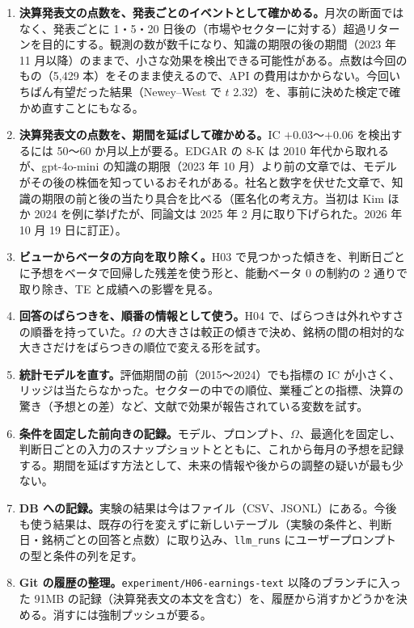 \documentclass[xelatex,ja=standard,jafont=haranoaji,a4paper,10pt,openany]{bxjsreport}
\newcommand{\code}[1]{\texttt{#1}}
\begin{document}
\begin{enumerate}
\item \textbf{決算発表文の点数を、発表ごとのイベントとして確かめる。}月次の断面ではなく、発表ごとに 1・5・20 日後の（市場やセクターに対する）超過リターンを目的にする。観測の数が数千になり、知識の期限の後の期間（2023 年 11 月以降）のままで、小さな効果を検出できる可能性がある。点数は今回のもの（5,429 本）をそのまま使えるので、API の費用はかからない。今回いちばん有望だった結果（Newey--West で $t$ 2.32）を、事前に決めた検定で確かめ直すことにもなる。
\item \textbf{決算発表文の点数を、期間を延ばして確かめる。}IC $+0.03$〜$+0.06$ を検出するには 50〜60 か月以上が要る。EDGAR の 8-K は 2010 年代から取れるが、gpt-4o-mini の知識の期限（2023 年 10 月）より前の文章では、モデルがその後の株価を知っているおそれがある。社名と数字を伏せた文章で、知識の期限の前と後の当たり具合を比べる（匿名化の考え方。当初は Kim ほか 2024 を例に挙げたが、同論文は 2025 年 2 月に取り下げられた。2026 年 10 月 19 日に訂正）。
\item \textbf{ビューからベータの方向を取り除く。}H03 で見つかった傾きを、判断日ごとに予想をベータで回帰した残差を使う形と、能動ベータ 0 の制約の 2 通りで取り除き、TE と成績への影響を見る。
\item \textbf{回答のばらつきを、順番の情報として使う。}H04 で、ばらつきは外れやすさの順番を持っていた。$\Omega$ の大きさは較正の傾きで決め、銘柄の間の相対的な大きさだけをばらつきの順位で変える形を試す。
\item \textbf{統計モデルを直す。}評価期間の前（2015〜2024）でも指標の IC が小さく、リッジは当たらなかった。セクターの中での順位、業種ごとの指標、決算の驚き（予想との差）など、文献で効果が報告されている変数を試す。
\item \textbf{条件を固定した前向きの記録。}モデル、プロンプト、$\Omega$、最適化を固定し、判断日ごとの入力のスナップショットとともに、これから毎月の予想を記録する。期間を延ばす方法として、未来の情報や後からの調整の疑いが最も少ない。
\item \textbf{DB への記録。}実験の結果は今はファイル（CSV、JSONL）にある。今後も使う結果は、既存の行を変えずに新しいテーブル（実験の条件と、判断日・銘柄ごとの回答と点数）に取り込み、\code{llm\_runs} にユーザープロンプトの型と条件の列を足す。
\item \textbf{Git の履歴の整理。}\code{experiment/H06-earnings-text} 以降のブランチに入った 91MB の記録（決算発表文の本文を含む）を、履歴から消すかどうかを決める。消すには強制プッシュが要る。
\end{enumerate}
\end{document}
